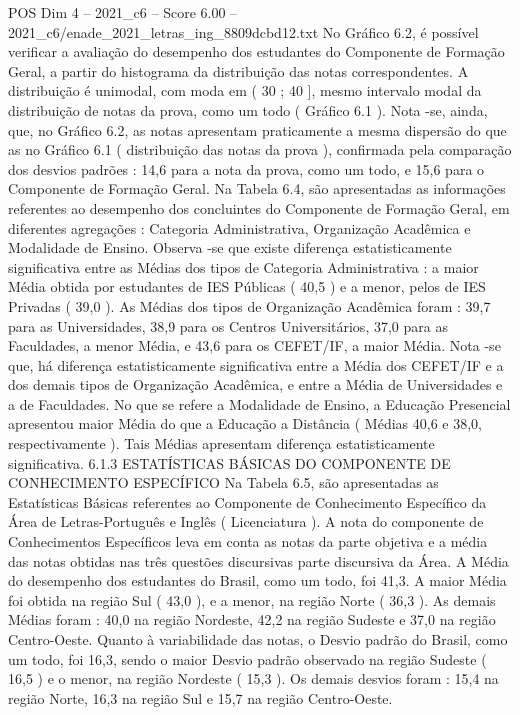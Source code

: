 \begin{textsample}{POS Dim 4 – 2021\_c6 – Score 6.00 – 2021\_c6/enade\_2021\_letras\_ing\_8809dcbd12.txt}
No Gráfico 6.2, é possível verificar a avaliação do desempenho dos estudantes do Componente de Formação Geral, a partir do histograma da distribuição das notas correspondentes.
A distribuição é unimodal, com moda em ( 30 ; 40 ], mesmo intervalo modal da distribuição de notas da prova, como um todo ( Gráfico 6.1 ).
Nota -se, ainda, que, no Gráfico 6.2, as notas apresentam praticamente a mesma dispersão do que as no Gráfico 6.1 ( distribuição das notas da prova ), confirmada pela comparação dos desvios padrões : 14,6 para a nota da prova, como um todo, e 15,6 para o Componente de Formação Geral.
Na Tabela 6.4, são apresentadas as informações referentes ao desempenho dos concluintes do Componente de Formação Geral, em diferentes agregações : Categoria Administrativa, Organização Acadêmica e Modalidade de Ensino.
Observa -se que existe diferença estatisticamente significativa entre as Médias dos tipos de Categoria Administrativa : a maior Média obtida por estudantes de IES Públicas ( 40,5 ) e a menor, pelos de IES Privadas ( 39,0 ).
As Médias dos tipos de Organização Acadêmica foram : 39,7 para as Universidades, 38,9 para os Centros Universitários, 37,0 para as Faculdades, a menor Média, e 43,6 para os CEFET/IF, a maior Média.
Nota -se que, há diferença estatisticamente significativa entre a Média dos CEFET/IF e a dos demais tipos de Organização Acadêmica, e entre a Média de Universidades e a de Faculdades.
No que se refere a Modalidade de Ensino, a Educação Presencial apresentou maior Média do que a Educação a Distância ( Médias 40,6 e 38,0, respectivamente ).
Tais Médias apresentam diferença estatisticamente significativa. 6.1.3 ESTATÍSTICAS BÁSICAS DO COMPONENTE DE CONHECIMENTO ESPECÍFICO Na Tabela 6.5, são apresentadas as Estatísticas Básicas referentes ao Componente de Conhecimento Específico da Área de Letras-Português e Inglês ( Licenciatura ).
A nota do componente de Conhecimentos Específicos leva em conta as notas da parte objetiva e a média das notas obtidas nas três questões discursivas parte discursiva da Área.
A Média do desempenho dos estudantes do Brasil, como um todo, foi 41,3.
A maior Média foi obtida na região Sul ( 43,0 ), e a menor, na região Norte ( 36,3 ).
As demais Médias foram : 40,0 na região Nordeste, 42,2 na região Sudeste e 37,0 na região Centro-Oeste.
Quanto à variabilidade das notas, o Desvio padrão do Brasil, como um todo, foi 16,3, sendo o maior Desvio padrão observado na região Sudeste ( 16,5 ) e o menor, na região Nordeste ( 15,3 ).
Os demais desvios foram : 15,4 na região Norte, 16,3 na região Sul e 15,7 na região Centro-Oeste.

\end{textsample}
